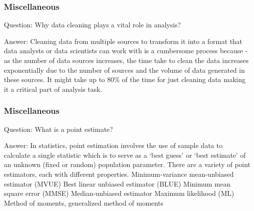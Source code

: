 \documentclass[11pt]{beamer}
\begin{document}
\begin{frame}
\frametitle{Miscellaneous}
\begin{block}{Question:}
	Why data cleaning plays a vital role in analysis?
\end{block}
\begin{block}{Answer:}
	Cleaning data from multiple sources to transform it into a format that data analysts or data scientists can work with is a cumbersome process because - as the number of data sources increases, the time take to clean the data increases exponentially due to the number of sources and the volume of data generated in these sources. It might take up to $80\%$ of the time for just cleaning data making it a critical part of analysis task.
\end{block}
\end{frame}

\begin{frame}
\frametitle{Miscellaneous}
\begin{block}{Question:}
	What is a point estimate?
\end{block}
\begin{block}{Answer:}
	In statistics, point estimation involves the use of sample data to calculate a single statistic which is to serve as a ‘best guess’ or ‘best estimate’ of an unknown (fixed or random) population parameter. There are a variety of point estimators, each with different properties.
	Minimum-variance mean-unbiased estimator (MVUE)
	Best linear unbiased estimator (BLUE)
	Minimum mean square error (MMSE)
	Median-unbiased estimator
	Maximum likelihood (ML)
	Method of moments, generalized method of moments
\end{block}
\end{frame}
\end{document}
